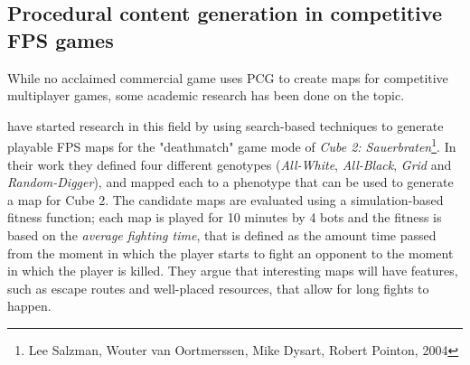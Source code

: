 \documentclass{Configuration_Files/PoliMi3i_thesis}
\begin{document}
\subsection{Procedural content generation in competitive FPS games}
While no acclaimed commercial game uses PCG to create maps for competitive multiplayer games, some academic research has been done on the topic.

\citeauthor{cardamone_evolving_2011} have started research in this field by using search-based techniques to generate playable FPS maps for the "deathmatch" game mode of \textit{Cube 2: Sauerbraten}\footnote{Lee Salzman, Wouter van Oortmerssen, Mike Dysart, Robert Pointon, 2004}. In their work they defined four different genotypes (\textit{All-White}, \textit{All-Black}, \textit{Grid} and \textit{Random-Digger}), and mapped each to a phenotype that can be used to generate a map for Cube 2. The candidate maps are evaluated using a simulation-based fitness function; each map is played for 10 minutes by 4 bots and the fitness is based on the \textit{average fighting time}, that is defined as the amount time passed from the moment in which the player starts to fight an opponent to the moment in which the player is killed. They argue that interesting maps will have features, such as escape routes and well-placed resources, that allow for long fights to happen. \cite{cardamone_evolving_2011}
\end{document}
